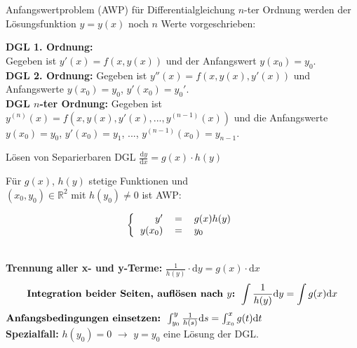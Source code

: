 \begin{concept}{Anfangswertproblem (AWP)}
  für Differentialgleichung $n$-ter Ordnung werden der Lösungsfunktion $y = y(x)$ noch $n$ Werte vorgeschrieben:

\textbf{DGL 1. Ordnung:} \\
Gegeben ist $y'(x) = f(x, y(x))$ und der Anfangswert $y(x_0) = y_0$.
\vspace{2mm}\\
\textbf{DGL 2. Ordnung:} 
Gegeben ist $y''(x) = f(x, y(x), y'(x))$ und \\ Anfangswerte $y(x_0) = y_0$, $y'(x_0) = y_0'$.
\vspace{2mm}\\
\textbf{DGL $n$-ter Ordnung:}
Gegeben ist \\ $y^{(n)}(x) = f(x, y(x), y'(x), ..., y^{(n-1)}(x))$ und die Anfangswerte $y(x_0) = y_0$, $y'(x_0) = y_1$, ..., $y^{(n-1)}(x_0) = y_{n-1}$.
\end{concept}

\begin{KR}{Lösen von Separierbaren DGL}
  $\frac{\mathrm{d}y}{\mathrm{d}x}=g(x)\cdot h(y)$
  
  \begin{minipage}{0.55\linewidth}
  Für \(g(x)\), \(h(y)\) stetige Funktionen und \\ \((x_0,y_0)\in \mathbb{R}^2\) mit \(h(y_0)\neq 0\) ist AWP:
  \end{minipage}
  \begin{minipage}{0.45\linewidth}
    \vspace{-3mm}
  \[\left\{\begin{tabular}{rcl}
	  \(y'\)&\(=\)&\(g(x)h(y)\)\\
	  \(y(x_0)\)&\(=\)&\(y_0\)\\
      \end{tabular}\right.\]
  \end{minipage}
  \vspace{1mm}\\
  \textbf{Trennung aller x- und y-Terme:} $\frac{1}{h(y)}\cdot \mathrm{d}y=g(x)\cdot \mathrm{d}x$
  $$\text{\textbf{Integration beider Seiten, auflösen nach \(y\):} } \int{\frac{1}{h(y)}\mathrm{d}y}=\int{g(x)\mathrm{d}x}$$
  $\text{\textbf{Anfangsbedingungen einsetzen: }} \int_{y_0}^{y}{\frac{1}{h(s)}\mathrm{d}s}=\int_{x_0}^{x}{g(t)\mathrm{d}t}$
  \vspace{1mm}\\
  \small
  \textbf{Spezialfall:} \(h(y_0)=0\) $\rightarrow$ \(y=y_0\) eine Lösung der DGL.
\end{KR}

